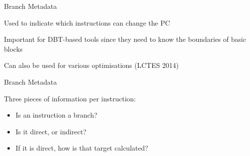 \begin{frame}{Branch Metadata}

Used to indicate which instructions can change the PC

Important for DBT-based tools since they need to know the boundaries of basic blocks

Can also be used for various optimisations (LCTES 2014)



\end{frame}

\begin{frame}{Branch Metadata}

Three pieces of information per instruction:

\begin{itemize}
\item Is an instruction a branch?
\item Is it direct, or indirect?
\item If it is direct, how is that target calculated?
\end{itemize}

\end{frame}
